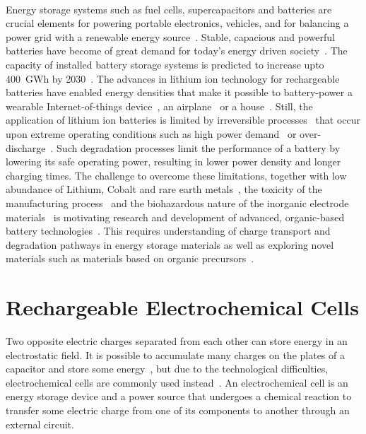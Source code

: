 \paragraph*{}
Energy storage systems such as fuel cells, supercapacitors and batteries are crucial elements for powering portable electronics, vehicles, and for balancing a power grid with a renewable energy source~\cite{janoschka2012_advmater}. Stable, capacious and powerful batteries have become of great demand for today's energy driven society~\cite{Yoo2014,Xu2020,Nitta2015}. The capacity of installed battery storage systems is predicted to increase upto 400~GWh by 2030~\cite{Figgener_2020}. The advances in lithium ion technology for rechargeable batteries have enabled energy densities that make it possible to battery-power a wearable Internet-of-things device~\cite{Lee2013,Maddikunta2020}, an airplane~\cite{Kadlec2014} or a house~\cite{Diouf2019,Hirasawa2021}. Still, the application of lithium ion batteries is limited by irreversible processes~\cite{Larsson2017,Fu2015,Zhang2021} that occur upon extreme operating conditions such as high power demand~\cite{Zhang2022,Guan2018} or over-discharge~\cite{Ma2020}. Such degradation processes limit the performance of a battery by lowering its safe operating power, resulting in lower power density and longer charging times. The challenge to overcome these limitations, together with low abundance of Lithium, Cobalt and rare earth metals~\cite{Xu2020,janoschka2012_advmater}, the toxicity of the manufacturing process~\cite{Prazanov2022,Peters2017} and the biohazardous nature of the inorganic electrode materials~\cite{Casado_2021_book} is motivating research and development of advanced, organic-based battery technologies~\cite{Degen2022}. This requires understanding of charge transport and degradation pathways in energy storage materials as well as exploring novel materials such as materials based on organic precursors~\cite{Lu2020,Kim2023}.\\

\section{Rechargeable Electrochemical Cells}
Two opposite electric charges separated from each other can store energy in an electrostatic field. It is possible to accumulate many charges on the plates of a capacitor and store some energy~\cite{He_2022}, but due to the technological difficulties, electrochemical cells are commonly used instead~\cite{Figgener_2020}. An electrochemical cell is an energy storage device and a power source that undergoes a chemical reaction to transfer some electric charge from one of its components to another through an external circuit. 

